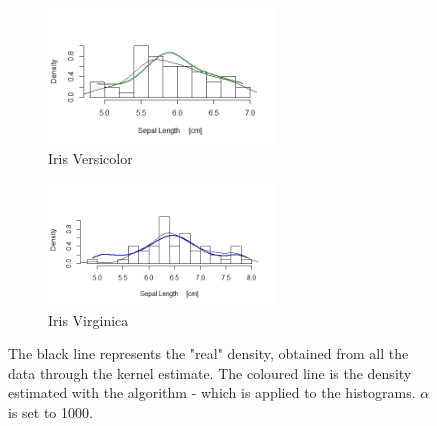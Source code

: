 \begin{figure}[ht]
	
	\begin{subfigure}{.5\textwidth}
		\includegraphics[width=6cm]{./pictures/iris/versicolor_100.jpeg} 
		\caption*{Iris Versicolor}
		\label{fig:versicolor}
	\end{subfigure}
	\begin{subfigure}{.5\textwidth}
		\includegraphics[width=6cm]{./pictures/iris/virginica_1000.jpeg}
		\caption*{Iris Virginica}
		\label{fig:virginica}
	\end{subfigure}
		
	\caption{The black line represents the "real" density, obtained from all the data through the kernel estimate. The coloured line is the density estimated with the algorithm - which is applied to the histograms. $\alpha$ is set to 1000.}
	\label{fig:iris_v}
	
\end{figure}








